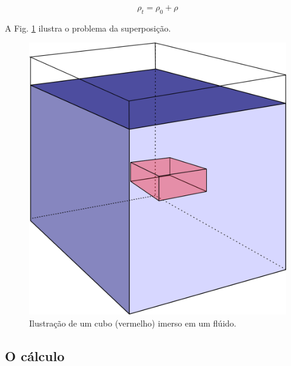 \documentclass[12pt,a4paper,final]{report}%
\begin{document}
\begin{equation}
\rho_{t}=\rho_{0}+\rho
\label{denstotal}
\end{equation}

A Fig. \ref{fig1} ilustra o problema da superposição.

\begin{figure}[H]
\centering
\includegraphics[scale=0.4]{Imagens/CPcubo.png}
\caption{Ilustração de um cubo (vermelho) imerso em um flúido.}
\label{fig1}
\end{figure}


\subsection*{O cálculo}





\end{document}
